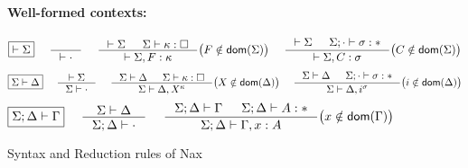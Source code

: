 \begin{figure}
\begin{framed}
\paragraph{Well-formed contexts:}
\[ \fbox{$|- \Sigma$}
 ~~~~
   \inference{}{|- \cdot}
 ~~~~
   \inference{|- \Sigma & \Sigma |- \kappa:\square}
             {|- \Sigma,F:\kappa}
      \big( F\notin\dom(\Sigma) \big)
 ~~~~
   \inference{|- \Sigma & \Sigma;\cdot |- \sigma:*}
             {|- \Sigma,C:\sigma}
      \big( C\notin\dom(\Sigma) \big)
\]
\[ \fbox{$\Sigma|- \Delta$}
 ~~~~
   \inference{|- \Sigma}{\Sigma |- \cdot}
 ~~~~
   \inference{\Sigma |- \Delta & \Sigma |- \kappa:\square}
             {\Sigma |- \Delta,X^\kappa}
      \big( X\notin\dom(\Delta) \big)
 ~~~~ 
   \inference{\Sigma |- \Delta & \Sigma;\cdot |- \sigma:*}
             {\Sigma |- \Delta,i^\sigma}
      \big( i\notin\dom(\Delta) \big)
\]
\[ \fbox{$\Sigma;\Delta |- \Gamma$}
 ~~~~
   \inference{\Sigma |- \Delta}{\Sigma;\Delta |- \cdot}
 ~~~~
   \inference{\Sigma;\Delta |- \Gamma & \Sigma;\Delta |- A:*}
             {\Sigma;\Delta |- \Gamma,x:A}
      \big( x\notin\dom(\Gamma) \big)
\]
\end{framed}
\caption{Syntax and Reduction rules of Nax}
\label{fig:NaxSyntax}
\end{figure}

